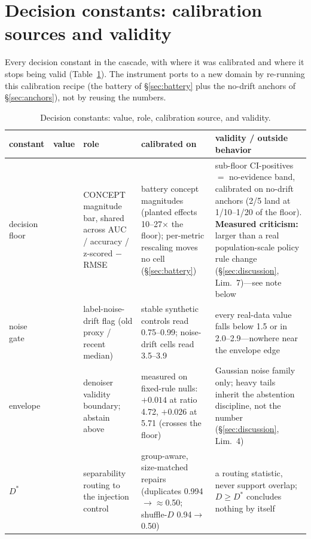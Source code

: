 \documentclass[10pt]{article} %
\begin{document}
\section{Decision constants: calibration sources and validity}\label{app:constants}

Every decision constant in the cascade, with where it was calibrated and where it stops being
valid (Table~\ref{tab:constants}). The instrument ports to a new domain by re-running this
calibration recipe (the battery of \S\ref{sec:battery} plus the no-drift anchors of
\S\ref{sec:anchors}), not by reusing the numbers.

\begin{table}[h]
\caption{Decision constants: value, role, calibration source, and validity.}
\label{tab:constants}
\centering
\scriptsize
\setlength{\tabcolsep}{3pt}
\begin{tabular}{@{}>{\raggedright\arraybackslash}p{0.78in}>{\raggedright\arraybackslash}p{0.72in}>{\raggedright\arraybackslash}p{1.22in}>{\raggedright\arraybackslash}p{1.62in}>{\raggedright\arraybackslash}p{1.62in}@{}}
\toprule
constant & value & role & calibrated on & validity / outside behavior \\
\midrule
decision floor & 0.02 & CONCEPT magnitude bar, shared across AUC / accuracy / z-scored $-$RMSE & battery concept magnitudes (planted effects 10--27$\times$ the floor); per-metric rescaling moves no cell (\S\ref{sec:battery}) & sub-floor CI-positives $=$ no-evidence band, calibrated on no-drift anchors (2/5 land at 1/10--1/20 of the floor). \textbf{Measured criticism:} larger than a real population-scale policy rule change (\S\ref{sec:discussion}, Lim.~7)---see note below \\
noise gate & 1.5 & label-noise-drift flag (old proxy / recent median) & stable synthetic controls read 0.75--0.99; noise-drift cells read 3.5--3.9 & every real-data value falls below 1.5 or in 2.0--2.9---nowhere near the envelope edge \\
envelope & 4.7 & denoiser validity boundary; abstain above & measured on fixed-rule nulls: $+0.014$ at ratio 4.72, $+0.026$ at 5.71 (crosses the floor) & Gaussian noise family only; heavy tails inherit the abstention discipline, not the number (\S\ref{sec:discussion}, Lim.~4) \\
$D^{\ast}$ & 0.96 & separability routing to the injection control & group-aware, size-matched repairs (duplicates 0.994$\to{\approx}$0.50; shuffle-$D$ 0.94$\to$0.50) & a routing statistic, never support overlap; $D \ge D^{\ast}$ concludes nothing by itself \\

\end{tabular}
\end{table}
\end{document}
